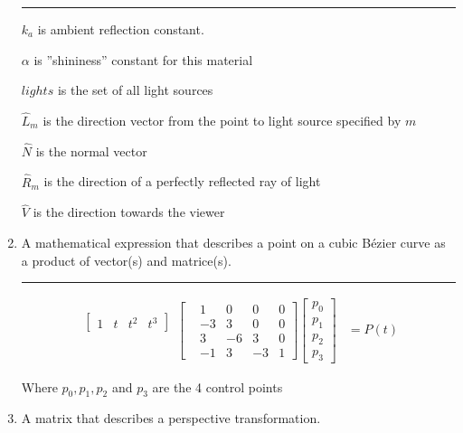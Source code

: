 \documentclass[oneside]{article}
\newenvironment{answer}
  {\vspace*{0.2cm} \rule{12cm}{0.02cm} \vspace*{0.2cm}}
  {\vspace*{0.2cm}}
\begin{document}
\begin{enumerate}
\begin{answer}
	      	$k_a$ is  ambient reflection constant.

	      	$\alpha$ is ''shininess'' constant for this material

	      	$lights$ is the set of all light sources

	      	$\hat{L}_m$ is the direction vector from the point to light source specified by $m$

	      	$\hat{N}$ is the normal vector

	      	$\hat{R}_m$ is the direction of a perfectly reflected ray of light

	      	$\hat{V}$ is the direction towards the viewer
	      \end{answer}

	\item A mathematical expression that describes a point on a cubic B\'{e}zier curve as a product of vector(s) and matrice(s).

	      \begin{answer}
	      	\begin{align*}
	      		\begin{matrix}
	      		\begin{bmatrix}
	      		1  & t  & t^2 & t^3
	      		\end{bmatrix} \\
	      		\mbox{} \\
	      		\mbox{} \\
	      		\mbox{}
	      		\end{matrix}
	      		\begin{bmatrix}
	      		  & 1  & 0  & 0  & 0 \\
	      		  & -3 & 3  & 0  & 0 \\
	      		  & 3  & -6 & 3  & 0 \\
	      		  & -1 & 3  & -3 & 1
	      		\end{bmatrix}
	      		\begin{bmatrix}
	      		p_0 \\
	      		p_1 \\
	      		p_2 \\
	      		p_3
	      		\end{bmatrix}
	      		& = P(t)
	      	\end{align*}

	      	Where $p_0, p_1, p_2$ and $p_3$ are the 4 control points
	      \end{answer}

	\item A matrix that describes a perspective transformation.


\end{enumerate}
\end{document}
